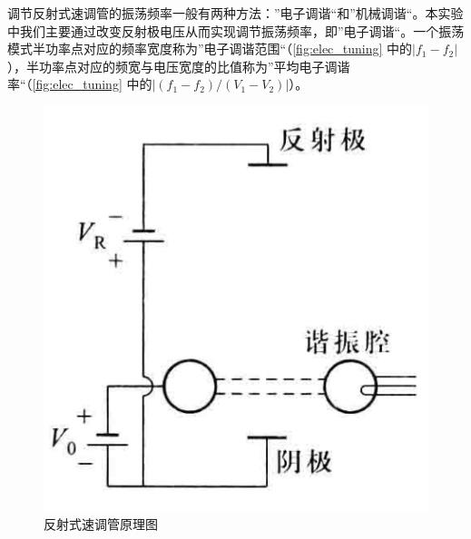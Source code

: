 \documentclass[font=default]{mpltx}
\begin{document}
调节反射式速调管的振荡频率一般有两种方法：”电子调谐“和”机械调谐“。本实验中我们主要通过改变反射极电压从而实现调节振荡频率，即”电子调谐“。一个振荡模式半功率点对应的频率宽度称为”电子调谐范围“（\autoref{fig:elec_tuning} 中的$|f_1-f_2|$），半功率点对应的频宽与电压宽度的比值称为”平均电子调谐率“（\autoref{fig:elec_tuning} 中的$|(f_1-f_2)/(V_1-V_2)|$）。
\begin{figure}[h]
  \centering
  \begin{minipage}[t]{0.3\textwidth}
    \centering
    \vspace{-6cm}
    \includegraphics[width=\textwidth]{fig/reflex_klystron.png}
    \caption{反射式速调管原理图}
    \label{fig:reflex_klystron} 
  \end{minipage}
  \hspace{1cm}
  \begin{minipage}[t]{0.33\textwidth}
    \centering

\end{minipage}
\end{figure}
\end{document}
